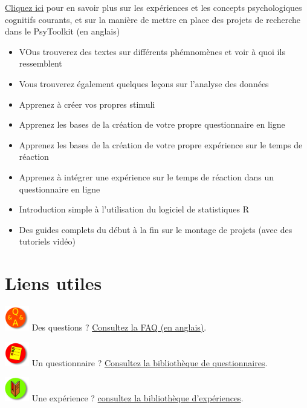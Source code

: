 \documentclass[
]{book}
\providecommand{\tightlist}{%
  \setlength{\itemsep}{0pt}\setlength{\parskip}{0pt}}
\begin{document}
\href{https://www.psytoolkit.org/lessons/}{Cliquez ici} pour en savoir plus sur les expériences et les concepts psychologiques cognitifs courants, et sur la manière de mettre en place des projets de recherche dans le PsyToolkit (en anglais)

\begin{itemize}
\tightlist
\item
  VOus trouverez des textes sur différents phémnomènes et voir à quoi ils ressemblent
\item
  Vous trouverez également quelques leçons sur l'analyse des données
\item
  Apprenez à créer vos propres stimuli
\item
  Apprenez les bases de la création de votre propre questionnaire en ligne
\item
  Apprenez les bases de la création de votre propre expérience sur le temps de réaction
\item
  Apprenez à intégrer une expérience sur le temps de réaction dans un questionnaire en ligne
\item
  Introduction simple à l'utilisation du logiciel de statistiques R
\item
  Des guides complets du début à la fin sur le montage de projets (avec des tutoriels vidéo)
\end{itemize}

\hypertarget{liens-utiles}{%
\section{Liens utiles}\label{liens-utiles}}

\includegraphics{img/qaa.png} Des questions ? \href{https://www.psytoolkit.org/faq.html}{Consultez la FAQ (en anglais)}.

\includegraphics{img/surveys.png} Un questionnaire ? \href{https://www.psytoolkit.org/survey-library}{Consultez la bibliothèque de questionnaires}.

\includegraphics{img/lib.png} Une expérience ? \href{https://www.psytoolkit.org/experiment-library}{consultez la bibliothèque d'expériences}.
\end{document}
